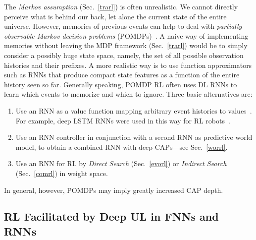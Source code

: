 \documentclass[letterpaper]{article}
\begin{document}
\begin{CJK*}{UTF8}{gbsn}
\begin{sloppypar}
The {\em Markov assumption} 
(Sec.~\ref{trarl}) is often unrealistic. We cannot directly perceive 
what is behind our back, let alone the current state of the entire universe. 
However, memories of previous events
can help to deal with  
{\em partially observable Markov decision problems} (POMDPs)~\citep[e.g.,][]{Schmidhuber:90sandiego,Schmidhuber:91nips,Ring:91,Ring:93,Ring:94,Williams:92,Lin:93,Teller:94,Kaelbling:95,Littman:95,Boutilier:96,Jaakkola:95,McCallum:96,kimura1997,Wiering:96levin,Wiering:97ab,otsuka2010}.
A naive way of implementing memories without leaving the MDP framework 
(Sec.~\ref{trarl}) would be to simply consider a 
possibly huge state space, namely, 
the set of all possible observation histories and their prefixes. 
A more realistic way is to use function approximators such as RNNs that produce 
compact state features as a function of the entire history seen so far.
Generally speaking, POMDP RL often uses DL RNNs to learn 
which events to memorize and which to ignore.
Three basic alternatives are: 
\begin{enumerate}
\item
Use an RNN as a value function mapping arbitrary event histories to values~\citep[e.g.,][]{Schmidhuber:90cmss,Schmidhuber:91nips,Lin:93,Bakker:01nips}. 
For example, deep LSTM RNNs were used in this way for RL robots~\citep{Bakker:03robot}.
\item
Use an RNN controller in conjunction with a second RNN as predictive world model,
to obtain a combined RNN with deep CAPs---see Sec.~\ref{worrl}.
\item
Use an RNN for RL by {\em Direct Search} (Sec.~\ref{evorl}) or {\em Indirect Search} (Sec.~\ref{comrl}) in weight space.
\end{enumerate}
In general, however, POMDPs may imply greatly increased CAP depth.



\subsection{RL Facilitated by Deep UL in FNNs and RNNs}
\label{unsrl}


\end{sloppypar}
\end{CJK*}
\end{document}
